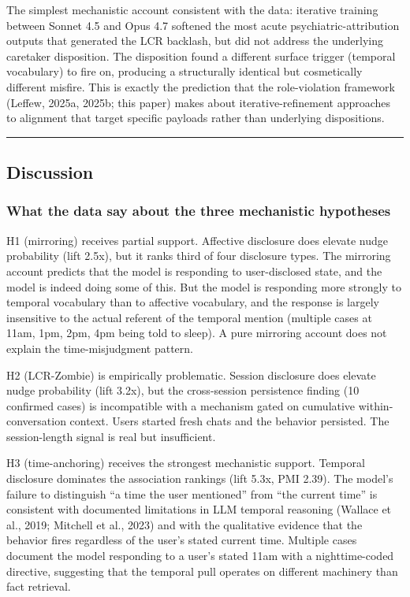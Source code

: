 \documentclass[11pt]{article}
\begin{document}
The simplest mechanistic account consistent with the data: iterative training between Sonnet 4.5 and Opus 4.7 softened the most acute psychiatric-attribution outputs that generated the LCR backlash, but did not address the underlying caretaker disposition. The disposition found a different surface trigger (temporal vocabulary) to fire on, producing a structurally identical but cosmetically different misfire. This is exactly the prediction that the role-violation framework (Leffew, 2025a, 2025b; this paper) makes about iterative-refinement approaches to alignment that target specific payloads rather than underlying dispositions.

\bigskip\hrule\bigskip

\subsection{Discussion}

\subsubsection{What the data say about the three mechanistic hypotheses}

H1 (mirroring) receives partial support. Affective disclosure does elevate nudge probability (lift 2.5x), but it ranks third of four disclosure types. The mirroring account predicts that the model is responding to user-disclosed state, and the model is indeed doing some of this. But the model is responding more strongly to temporal vocabulary than to affective vocabulary, and the response is largely insensitive to the actual referent of the temporal mention (multiple cases at 11am, 1pm, 2pm, 4pm being told to sleep). A pure mirroring account does not explain the time-misjudgment pattern.

H2 (LCR-Zombie) is empirically problematic. Session disclosure does elevate nudge probability (lift 3.2x), but the cross-session persistence finding (10 confirmed cases) is incompatible with a mechanism gated on cumulative within-conversation context. Users started fresh chats and the behavior persisted. The session-length signal is real but insufficient.

H3 (time-anchoring) receives the strongest mechanistic support. Temporal disclosure dominates the association rankings (lift 5.3x, PMI 2.39). The model's failure to distinguish ``a time the user mentioned'' from ``the current time'' is consistent with documented limitations in LLM temporal reasoning (Wallace et al., 2019; Mitchell et al., 2023) and with the qualitative evidence that the behavior fires regardless of the user's stated current time. Multiple cases document the model responding to a user's stated 11am with a nighttime-coded directive, suggesting that the temporal pull operates on different machinery than fact retrieval.
\end{document}

